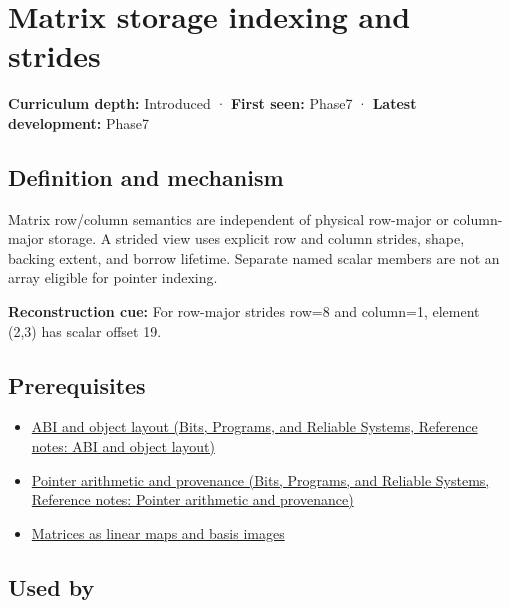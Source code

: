 \hypertarget{appendix-ffdc1d4e5350}{}\label{referencestart:appendix-ffdc1d4e5350}
\section{Matrix storage indexing and strides}\label{appendix-ffdc1d4e5350-matrix-storage-indexing-and-strides}

\textbf{Curriculum depth:} Introduced · \textbf{First seen:} Phase7 · \textbf{Latest development:} Phase7

\begin{allmightroledefinition}

\subsection{Definition and mechanism}\label{appendix-ffdc1d4e5350-definition-and-mechanism}

Matrix row/column semantics are independent of physical row-major or column-major storage. A strided view uses explicit row and column strides, shape, backing extent, and borrow lifetime. Separate named scalar members are not an array eligible for pointer indexing.

\end{allmightroledefinition}

\textbf{Reconstruction cue:} For row-major strides row=8 and column=1, element (2,3) has scalar offset 19.

\subsection{Prerequisites}\label{appendix-ffdc1d4e5350-prerequisites}

\begin{itemize}
\tightlist
\item
  \href{../01-Bits-Programs-and-Reliable-Systems/main.pdf\#nameddest=appendix-c4ac6bb0fff8}{ABI and object layout (Bits, Programs, and Reliable Systems, Reference notes: ABI and object layout)}
\item
  \href{../01-Bits-Programs-and-Reliable-Systems/main.pdf\#nameddest=appendix-6af5921bc853}{Pointer arithmetic and provenance (Bits, Programs, and Reliable Systems, Reference notes: Pointer arithmetic and provenance)}
\item
  \hyperref[appendix-bd39c3bf5d64]{Matrices as linear maps and basis images}
\end{itemize}

\subsection{Used by}\label{appendix-ffdc1d4e5350-used-by}

